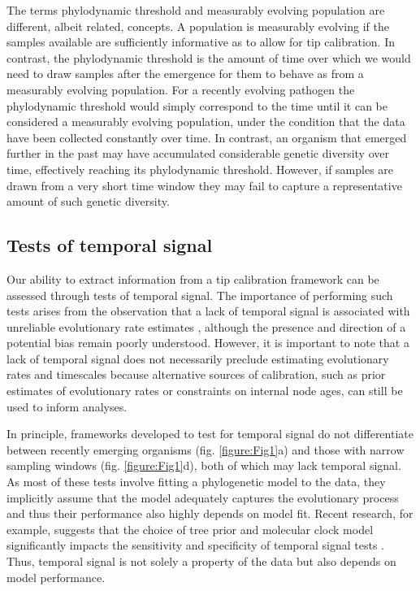 \documentclass[11pt]{article}
\begin{document}
The terms phylodynamic threshold and measurably evolving population are different, albeit related, concepts. A population is measurably evolving if the samples available are sufficiently informative as to allow for tip calibration. In contrast, the phylodynamic threshold is the amount of time over which we would need to draw samples after the emergence for them to behave as from a measurably evolving population. For a recently evolving pathogen the phylodynamic threshold would simply correspond to the time until it can be considered a measurably evolving population, under the condition that the data have been collected constantly over time. In contrast, an organism that emerged further in the past may have accumulated considerable genetic diversity over time, effectively reaching its phylodynamic threshold. However, if samples are drawn from a very short time window they may fail to capture a representative amount of such genetic diversity. 

\subsection{Tests of temporal signal}
Our ability to extract information from a tip calibration framework can be assessed through tests of temporal signal. The importance of performing such tests arises from the observation that a lack of temporal signal is associated with unreliable evolutionary rate estimates \citep{duchene2015performance, rieux2016inferences}, although the presence and direction of a potential bias remain poorly understood. However, it is important to note that a lack of temporal signal does not necessarily preclude estimating evolutionary rates and timescales because alternative sources of calibration, such as prior estimates of evolutionary rates or constraints on internal node ages, can still be used to inform analyses.

In principle, frameworks developed to test for temporal signal do not differentiate between recently emerging organisms (fig. \ref{figure:Fig1}a) and those with narrow sampling windows (fig. \ref{figure:Fig1}d), both of which may lack temporal signal. As most of these tests involve fitting a phylogenetic model to the data, they implicitly assume that the model adequately captures the evolutionary process and thus their performance also highly depends on model fit. Recent research, for example, suggests that the choice of tree prior and molecular clock model significantly impacts the sensitivity and specificity of temporal signal tests \citep{tay2024assessing}. Thus, temporal signal is not solely a property of the data but also depends on model performance.
\end{document}
